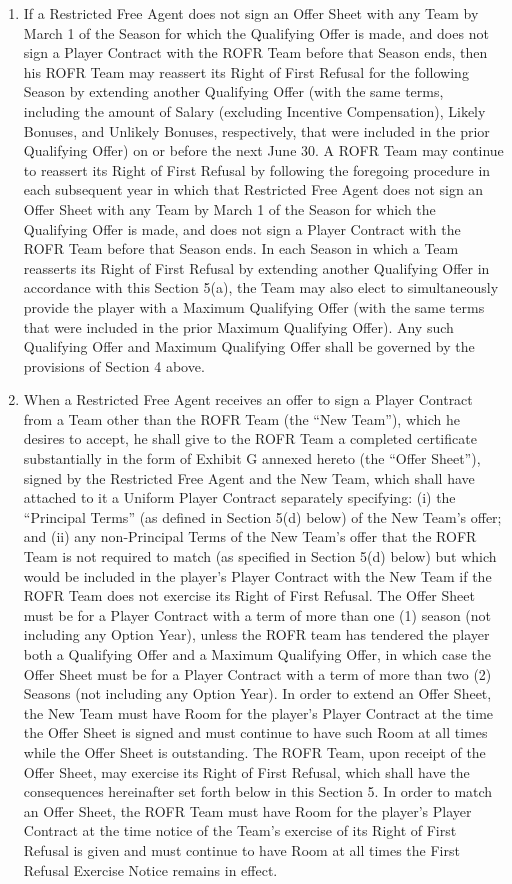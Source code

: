 \documentclass[
]{book}
\providecommand{\tightlist}{%
  \setlength{\itemsep}{0pt}\setlength{\parskip}{0pt}}
\begin{document}
\begin{enumerate}
\def\labelenumi{(\alph{enumi})}
\tightlist
\item
  If a Restricted Free Agent does not sign an Offer Sheet with any Team by March 1 of the Season for which the Qualifying Offer is made, and does not sign a Player Contract with the ROFR Team before that Season ends, then his ROFR Team may reassert its Right of First Refusal for the following Season by extending another Qualifying Offer (with the same terms, including the amount of Salary (excluding Incentive Compensation), Likely Bonuses, and Unlikely Bonuses, respectively, that were included in the prior Qualifying Offer) on or before the next June 30. A ROFR Team may continue to reassert its Right of First Refusal by following the foregoing procedure in each subsequent year in which that Restricted Free Agent does not sign an Offer Sheet with any Team by March 1 of the Season for which the Qualifying Offer is made, and does not sign a Player Contract with the ROFR Team before that Season ends. In each Season in which a Team reasserts its Right of First Refusal by extending another Qualifying Offer in accordance with this Section 5(a), the Team may also elect to simultaneously provide the player with a Maximum Qualifying Offer (with the same terms that were included in the prior Maximum Qualifying Offer). Any such Qualifying Offer and Maximum Qualifying Offer shall be governed by the provisions of Section 4 above.
\item
  When a Restricted Free Agent receives an offer to sign a Player Contract from a Team other than the ROFR Team (the ``New Team''), which he desires to accept, he shall give to the ROFR Team a completed certificate substantially in the form of Exhibit G annexed hereto (the ``Offer Sheet''), signed by the Restricted Free Agent and the New Team, which shall have attached to it a Uniform Player Contract separately specifying: (i) the ``Principal Terms'' (as defined in Section 5(d) below) of the New Team's offer; and (ii) any non-Principal Terms of the New Team's offer that the ROFR Team is not required to match (as specified in Section 5(d) below) but which would be included in the player's Player Contract with the New Team if the ROFR Team does not exercise its Right of First Refusal. The Offer Sheet must be for a Player Contract with a term of more than one (1) season (not including any Option Year), unless the ROFR team has tendered the player both a Qualifying Offer and a Maximum Qualifying Offer, in which case the Offer Sheet must be for a Player Contract with a term of more than two (2) Seasons (not including any Option Year). In order to extend an Offer Sheet, the New Team must have Room for the player's Player Contract at the time the Offer Sheet is signed and must continue to have such Room at all times while the Offer Sheet is outstanding. The ROFR Team, upon receipt of the Offer Sheet, may exercise its Right of First Refusal, which shall have the consequences hereinafter set forth below in this Section 5. In order to match an Offer Sheet, the ROFR Team must have Room for the player's Player Contract at the time notice of the Team's exercise of its Right of First Refusal is given and must continue to have Room at all times the First Refusal Exercise Notice remains in effect.

\end{enumerate}
\end{document}
